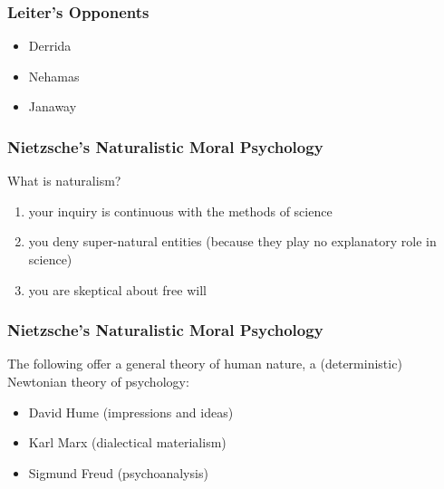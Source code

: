 \documentclass[xcolor=dvipsnames]{beamer}
\begin{document}

\begin{frame}
  \frametitle{Leiter's Opponents}
  \begin{itemize}
  \item Derrida
  \item Nehamas
  \item Janaway
  \end{itemize}
\end{frame}

\begin{frame}
  \frametitle{Nietzsche's Naturalistic Moral Psychology}
  What is naturalism?
  \begin{enumerate}
  \item your inquiry is continuous with the methods of science
  \item you deny super-natural entities (because they play no
    explanatory role in science)
  \item you are skeptical about free will 
  \end{enumerate}
\end{frame}

\begin{frame}
  \frametitle{Nietzsche's Naturalistic Moral Psychology}
  The following offer a general theory of human nature, a
  (deterministic) Newtonian theory of psychology:
  \begin{itemize}
  \item David Hume (impressions and ideas)
  \item Karl Marx (dialectical materialism)
  \item Sigmund Freud (psychoanalysis)
  \end{itemize}
\end{frame}
\end{document}
